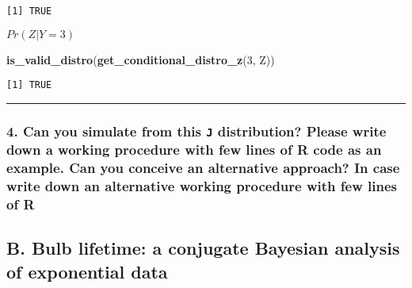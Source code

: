 \documentclass[
]{article}
\newenvironment{Shaded}{\begin{snugshade}}{\end{snugshade}}
\newcommand{\DecValTok}[1]{\textcolor[rgb]{0.00,0.00,0.81}{#1}}
\newcommand{\FunctionTok}[1]{\textcolor[rgb]{0.13,0.29,0.53}{\textbf{#1}}}
\newcommand{\NormalTok}[1]{#1}
\begin{document}
\begin{verbatim}
[1] TRUE
\end{verbatim}

\(Pr(Z | Y=3)\)

\begin{Shaded}
\begin{Highlighting}[]
\FunctionTok{is\_valid\_distro}\NormalTok{(}\FunctionTok{get\_conditional\_distro\_z}\NormalTok{(}\DecValTok{3}\NormalTok{, Z))}
\end{Highlighting}
\end{Shaded}

\begin{verbatim}
[1] TRUE
\end{verbatim}

\begin{center}\rule{0.5\linewidth}{0.5pt}\end{center}

\bigskip

\hypertarget{can-you-simulate-from-this-j-distribution-please-write-down-a-working-procedure-with-few-lines-of-r-code-as-an-example.-can-you-conceive-an-alternative-approach-in-case-write-down-an-alternative-working-procedure-with-few-lines-of-r}{%
\subsubsection{\texorpdfstring{4. Can you simulate from this \texttt{J}
distribution? Please write down a working procedure with few lines of R
code as an example. Can you conceive an alternative approach? In case
write down an alternative working procedure with few lines of
R}{4. Can you simulate from this J distribution? Please write down a working procedure with few lines of R code as an example. Can you conceive an alternative approach? In case write down an alternative working procedure with few lines of R}}\label{can-you-simulate-from-this-j-distribution-please-write-down-a-working-procedure-with-few-lines-of-r-code-as-an-example.-can-you-conceive-an-alternative-approach-in-case-write-down-an-alternative-working-procedure-with-few-lines-of-r}}

\bigskip

\newpage

\hypertarget{b.-bulb-lifetime-a-conjugate-bayesian-analysis-of-exponential-data}{%
\subsection{B. Bulb lifetime: a conjugate Bayesian analysis of
exponential
data}\label{b.-bulb-lifetime-a-conjugate-bayesian-analysis-of-exponential-data}}
\end{document}
